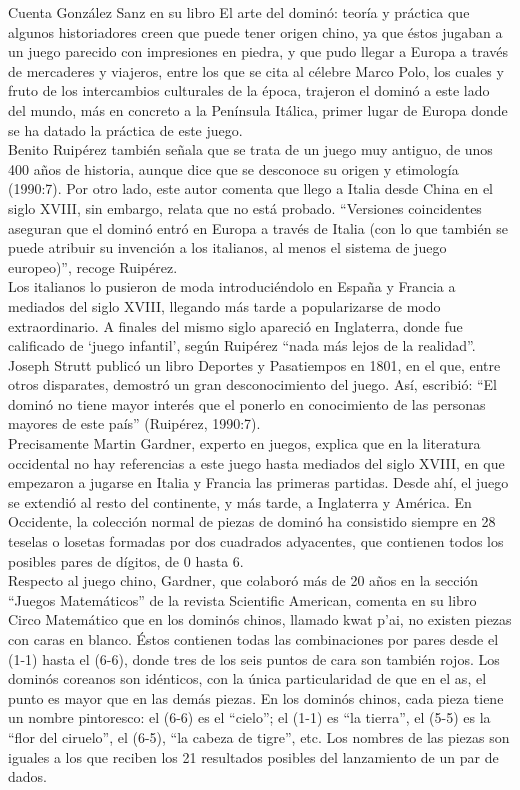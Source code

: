 Cuenta González Sanz en su libro El arte del dominó: teoría y práctica que algunos historiadores
creen que puede tener origen chino, ya que éstos jugaban a un juego parecido con impresiones en piedra,
y que pudo llegar a Europa a través de mercaderes y viajeros, entre los que se cita al célebre
Marco Polo, los cuales y fruto de los intercambios culturales de la época, trajeron el dominó a este
lado del mundo, más en concreto a la Península Itálica, primer lugar de Europa donde se ha datado la
práctica de este juego. \\

Benito Ruipérez también señala que se trata de un juego muy antiguo, de unos 400 años de historia,
aunque dice que se desconoce su origen y etimología (1990:7). Por otro lado, este autor comenta que
llego a Italia desde China en el siglo XVIII, sin embargo, relata que no está probado. “Versiones
coincidentes aseguran que el dominó entró en Europa a través de Italia (con lo que también se puede
atribuir su invención a los italianos, al menos el sistema de juego europeo)”, recoge Ruipérez. \\

Los italianos lo pusieron de moda introduciéndolo en España y Francia a mediados del siglo XVIII,
llegando más tarde a popularizarse de modo extraordinario. A finales del mismo siglo apareció en
Inglaterra, donde fue calificado de ‘juego infantil’, según Ruipérez “nada más lejos de la realidad”.
Joseph Strutt publicó un libro Deportes y Pasatiempos en 1801, en el que, entre otros disparates,
demostró un gran desconocimiento del juego. Así, escribió: “El dominó no tiene mayor interés que
el ponerlo en conocimiento de las personas mayores de este país” (Ruipérez, 1990:7). \\

Precisamente Martin Gardner, experto en juegos, explica que en la literatura occidental no hay
referencias a este juego hasta mediados del siglo XVIII, en que empezaron a jugarse en Italia y
Francia las primeras partidas. Desde ahí, el juego se extendió al resto del continente, y más tarde,
a Inglaterra y América. En Occidente, la colección normal de piezas de dominó ha consistido siempre
en 28 teselas o losetas formadas por dos cuadrados adyacentes, que contienen todos los posibles
pares de dígitos, de 0 hasta 6. \\

Respecto al juego chino, Gardner, que colaboró más de 20 años en la sección “Juegos Matemáticos” de
la revista Scientific American, comenta en su libro Circo Matemático que en los dominós chinos,
llamado kwat p’ai, no existen piezas con caras en blanco. Éstos contienen todas las combinaciones
por pares desde el (1-1)  hasta el (6-6), donde tres de los seis puntos de cara son también rojos.
Los dominós coreanos son idénticos, con la única particularidad de que en el as, el punto es mayor
que en las demás piezas. En los dominós chinos, cada pieza tiene un nombre pintoresco: el (6-6)
es el “cielo”; el (1-1) es “la tierra”, el (5-5) es la “flor del ciruelo”, el (6-5), “la cabeza de
tigre”, etc. Los nombres de las piezas son iguales a los que reciben los 21 resultados posibles del
lanzamiento de un par de dados. \\


